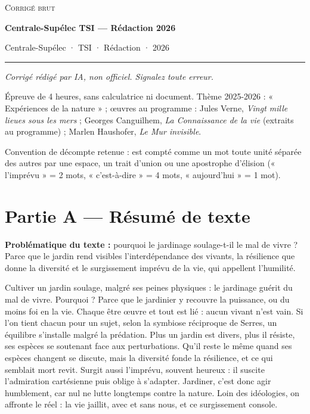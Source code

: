 \documentclass[11pt,a4paper]{article}
\begin{document}
\thispagestyle{plain}
\begin{center}
  {\small\scshape Corrigé brut}\par\smallskip
  {\LARGE\bfseries Centrale-Supélec TSI — Rédaction 2026\par}\medskip
  {\large Centrale-Supélec · TSI · Rédaction · 2026\par}
\end{center}
\vspace{2pt}\hrule\vspace{8pt}

\emph{Corrigé rédigé par IA, non officiel. Signalez toute erreur.}

Épreuve de 4 heures, sans calculatrice ni document. Thème 2025-2026 : « Expériences de la nature » ; œuvres au programme : Jules Verne, \emph{Vingt mille lieues sous les mers} ; Georges Canguilhem, \emph{La Connaissance de la vie} (extraits au programme) ; Marlen Haushofer, \emph{Le Mur invisible}.

Convention de décompte retenue : est compté comme un mot toute unité séparée des autres par une espace, un trait d'union ou une apostrophe d'élision (« l'imprévu » = 2 mots, « c'est-à-dire » = 4 mots, « aujourd'hui » = 1 mot).

\hypertarget{partie-a-ruxe9sumuxe9-de-texte}{%
\section{Partie A --- Résumé de texte}\label{partie-a-ruxe9sumuxe9-de-texte}}

\textbf{Problématique du texte :} pourquoi le jardinage soulage-t-il le mal de vivre ? Parce que le jardin rend visibles l'interdépendance des vivants, la résilience que donne la diversité et le surgissement imprévu de la vie, qui appellent l'humilité.

Cultiver un jardin soulage, malgré ses peines physiques : le jardinage guérit du mal de vivre. Pourquoi ? Parce que le jardinier y recouvre la puissance, ou du moins foi en la vie. Chaque être œuvre et tout est lié : aucun vivant n'est vain. Si l'on tient chacun pour un \textbf{\textbar{}} sujet, selon la symbiose réciproque de Serres, un équilibre s'installe malgré la prédation. Plus un jardin est divers, plus il résiste, ses espèces se soutenant face aux perturbations. Qu'il reste le même quand ses espèces changent se discute, mais la diversité fonde la résilience, et ce qui semblait \textbf{\textbar{}} mort revit. Surgit aussi l'imprévu, souvent heureux : il suscite l'admiration cartésienne puis oblige à s'adapter. Jardiner, c'est donc agir humblement, car nul ne lutte longtemps contre la nature. Loin des idéologies, on affronte le réel : la vie jaillit, avec et sans nous, et ce surgissement console. \textbf{\textbar{}}
\end{document}
